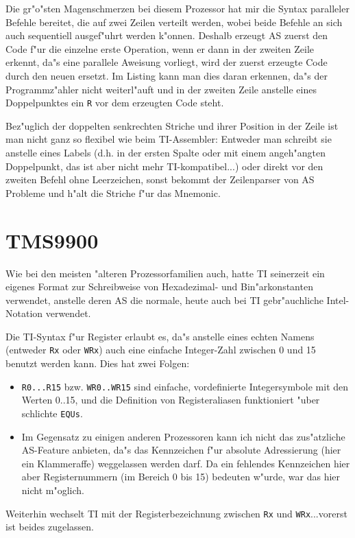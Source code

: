 \documentclass[12pt,a4paper,twoside]{report}
\newcommand{\tty}[1]{{\tt #1}}
\begin{document}
{Die gr"o"sten Magenschmerzen bei diesem Prozessor hat mir die Syntax
paralleler Befehle bereitet, die auf zwei Zeilen verteilt werden,
wobei beide Befehle an sich auch sequentiell ausgef"uhrt werden k"onnen.
Deshalb erzeugt AS zuerst den Code f"ur die einzelne erste Operation,
wenn er dann in der zweiten Zeile erkennt, da"s eine parallele Aweisung
vorliegt, wird der zuerst erzeugte Code durch den neuen ersetzt.
Im Listing kann man dies daran erkennen, da"s der Programmz"ahler
nicht weiterl"auft und in der zweiten Zeile anstelle eines Doppelpunktes
ein \tty{R} vor dem erzeugten Code steht.
\par
Bez"uglich der doppelten senkrechten Striche und ihrer Position in der
Zeile ist man nicht ganz so flexibel wie beim TI-Assembler: Entweder
man schreibt sie anstelle eines Labels (d.h. in der ersten Spalte oder
mit einem angeh"angten Doppelpunkt, das ist aber nicht mehr 
TI-kompatibel...) oder direkt vor den zweiten Befehl ohne Leerzeichen, 
sonst bekommt der Zeilenparser von AS Probleme und h"alt die Striche
f"ur das Mnemonic.


\section{TMS9900}

Wie bei den meisten "alteren Prozessorfamilien auch, hatte TI seinerzeit
ein eigenes Format zur Schreibweise von Hexadezimal- und Bin"arkonstanten
verwendet, anstelle deren AS die normale, heute auch bei TI
gebr"auchliche Intel-Notation verwendet.  

Die TI-Syntax f"ur Register erlaubt es, da"s anstelle eines echten Namens
(entweder \tty{Rx} oder \tty{WRx}) auch eine einfache Integer-Zahl
zwischen 0 und 15 benutzt werden kann.  Dies hat zwei Folgen:
\begin{itemize}
\item{\tty{R0...R15} bzw. \tty{WR0..WR15} sind einfache, vordefinierte
      Integersymbole mit den Werten 0..15, und die Definition von
      Registeraliasen funktioniert "uber schlichte \tty{EQUs}.}
\item{Im Gegensatz zu einigen anderen Prozessoren kann ich nicht das
      zus"atzliche AS-Feature anbieten, da"s das Kennzeichen f"ur
      absolute Adressierung (hier ein Klammeraffe) weggelassen werden
      darf.  Da ein fehlendes Kennzeichen hier aber Registernummern (im
      Bereich 0 bis 15) bedeuten w"urde, war das hier nicht m"oglich.}
\end{itemize}
Weiterhin wechselt TI mit der Registerbezeichnung zwischen \tty{Rx} und
\tty{WRx}...vorerst ist beides zugelassen.

}
\end{document}
